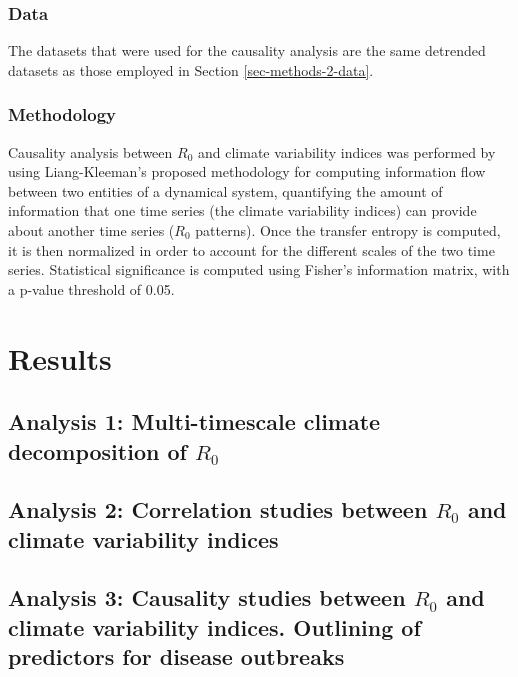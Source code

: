 \documentclass[article,10pt,twocolumn]{wlscirep}
\begin{document}
  \subsubsection{Data} \label{sec-methods-3-data}

  The datasets that were used for the causality analysis are the same detrended datasets as those employed in Section \ref{sec-methods-2-data}.

  \subsubsection{Methodology} \label{sec-methods-3-methodology}

  Causality analysis between $R_0$ and climate variability indices was performed by using Liang-Kleeman's proposed methodology for computing information flow between two entities of a dynamical system, quantifying the amount of information that one time series (the climate variability indices) can provide about another time series ($R_0$ patterns). Once the transfer entropy is computed, it is then normalized in order to account for the different scales of the two time series. Statistical significance is computed using Fisher's information matrix, with a p-value threshold of 0.05.


  \section{Results}

  \subsection{Analysis 1: Multi-timescale climate decomposition of $R_0$} \label{sec-results-1}

  \subsection{Analysis 2: Correlation studies between $R_0$ and climate variability indices} \label{sec-results-2} \label{sec-results-2}

  \subsection{Analysis 3: Causality studies between $R_0$ and climate variability indices. Outlining of predictors for disease outbreaks} \label{sec-results-3}
\end{document}

